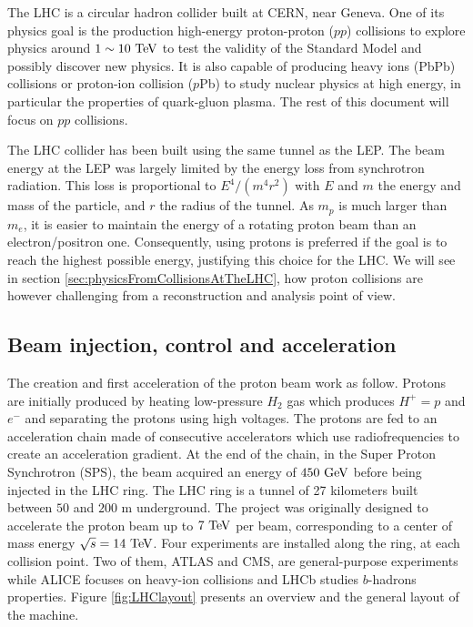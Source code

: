 
    The LHC is a circular hadron collider built at CERN, near Geneva. One of its physics
    goal is the production high-energy proton-proton ($pp$) collisions to explore physics around
    $1\sim10 ~\text{TeV}$ to test the validity of the Standard Model and possibly discover new
    physics. It is also capable of producing heavy ions (PbPb) collisions or proton-ion
    collision ($p$Pb) to study nuclear physics at high energy, in particular the properties
    of quark-gluon plasma. The rest of this document will focus on $pp$ collisions.

    The LHC collider has been built using the same tunnel as the LEP. The beam energy at
    the LEP was largely limited by the energy loss from synchrotron radiation. This loss
    is proportional to $E^4 / (m^{4} r^{2})$ with $E$ and $m$ the energy and mass of the
    particle, and $r$ the radius of the tunnel. As $m_p$ is much larger than $m_e$, it is
    easier to maintain the energy of a rotating proton beam than an electron/positron one.
    Consequently, using protons is preferred if the goal is to reach the highest possible
    energy, justifying this choice for the LHC. We will see in section
    \ref{sec:physicsFromCollisionsAtTheLHC}, how proton collisions are however challenging
    from a reconstruction and analysis point of view.

    \subsection{Beam injection, control and acceleration}

    The creation and first acceleration of the proton beam work as follow. Protons are initially
    produced by heating low-pressure $H_2$ gas which produces $H^+ = p$ and $e^-$ and
    separating the protons using high voltages. The protons are fed to an acceleration
    chain made of consecutive accelerators which use radiofrequencies to create an acceleration
    gradient. At the end of the chain, in the Super Proton Synchrotron (SPS), the
    beam acquired an energy of $450~\text{GeV}$ before being injected in the LHC ring. The LHC
    ring is a tunnel of 27 kilometers built between $50$ and $200$ m underground. The
    project was originally designed to accelerate the proton beam up to $7~\text{TeV}$ per beam,
    corresponding to a center of mass energy $\sqrt{s} = 14~\text{TeV}$. Four experiments are
    installed along the ring, at each collision point. Two of them, ATLAS and CMS, are
    general-purpose experiments while ALICE focuses on heavy-ion collisions and LHCb studies
    $b$-hadrons properties. Figure \ref{fig:LHClayout} presents an overview and the general
    layout of the machine.

